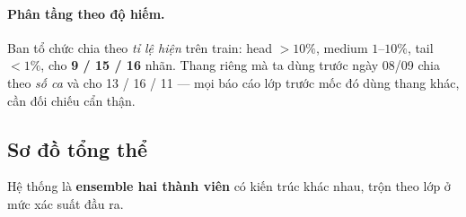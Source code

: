 \documentclass[11pt,a4paper]{article}
\begin{document}
\paragraph{Phân tầng theo độ hiếm.} Ban tổ chức chia theo \emph{tỉ lệ hiện} trên train:
head $>10\%$, medium $1$--$10\%$, tail $<1\%$, cho \textbf{9 / 15 / 16} nhãn. Thang riêng
mà ta dùng trước ngày 08/09 chia theo \emph{số ca} và cho 13 / 16 / 11 --- mọi báo cáo
lớp trước mốc đó dùng thang khác, cần đối chiếu cẩn thận.

\subsection{Sơ đồ tổng thể}

Hệ thống là \textbf{ensemble hai thành viên} có kiến trúc khác nhau, trộn theo lớp ở
mức xác suất đầu ra.
\end{document}
